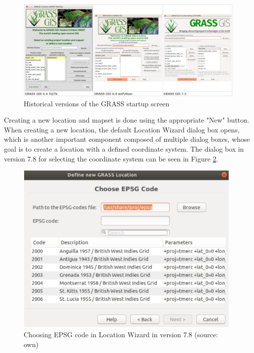 \documentclass[a4paper,10pt,twoside]{article}
\begin{document}
\vspace{0.3cm}
\begin{figure}[hbt!]
\begin{center}
\includegraphics[width=15cm]{pictures/verze_startup.png} 
\caption[Historical versions of the GRASS startup screen]{Historical versions of the GRASS startup screen}
\label{fig:verze_startup}
\end{center}
\end{figure}

Creating a new location and mapset is done using the appropriate "New" button. When creating a new location, the default Location Wizard dialog box opens, which is another important component composed of multiple dialog boxes, whose goal is to create a location with a defined coordinate system. The dialog box in version 7.8 for selecting the coordinate system can be seen in Figure \ref{fig:loc_wizard_sour_pred}.

\vspace{0.3cm}
\begin{figure}[hbt!]
\begin{center}
\includegraphics[width=11cm]{pictures/loc_wizard_sour_pred.png} 
\caption[Choosing EPSG code in Location Wizard in version 7.8]{Choosing EPSG code in Location Wizard in version 7.8 (source: own)}
\label{fig:loc_wizard_sour_pred}
\end{center}
\end{figure}
\end{document}
